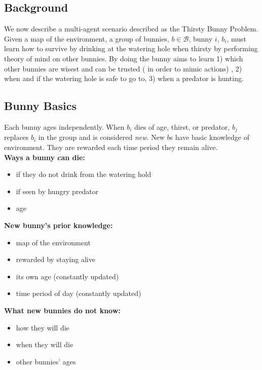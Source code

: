 \documentclass[twocolumn]{article}
\begin{document}
\subsection{Background}
We now describe a multi-agent scenario described as the Thirsty Bunny Problem. Given a map of the environment, a group of bunnies, $b \in \mathcal{B}$, bunny $i$, $b_i$, must learn how to survive by drinking at the watering hole when thirsty by performing theory of mind on other bunnies. By doing the bunny aims to learn 1) which other bunnies are wisest and can be trusted ( in order to mimic actions) , 2) when and if the watering hole is safe to go to, 3) when a predator is hunting. 

\subsection{Bunny Basics}
Each bunny ages independently. When $b_i$ dies of age, thirst, or predator, $b_j$ replaces $b_i$ in the group and is considered \textit{new}. New $b$s have basic knowledge of environment. They are rewarded each time period they remain alive. \\

\noindent\textbf{Ways a bunny can die:}
\begin{itemize}
	\item if they do not drink from the watering hold
    \item if seen by hungry predator
    \item age 
\end{itemize}

\noindent\textbf{New bunny's prior knowledge:}
\begin{itemize}
    \item map of the environment
    \item rewarded by staying alive
    \item its own age (constantly updated)
    \item time period of day (constantly updated)
\end{itemize}

\noindent\textbf{What new bunnies do not know:}
\begin{itemize}
    \item how they will die
    \item when they will die
    \item other bunnies' ages
\end{itemize}
\end{document}
